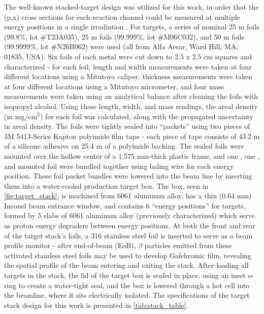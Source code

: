 \documentclass[3p]{elsarticle}
\begin{document}
The well-known stacked-target design was utilized for this work, in order that the (p,x) cross sections for each reaction channel could be measured at multiple energy positions in a single irradiation \cite{Graves2016}. 
For targets, a series of nominal 25 \micro m  foils (99.8\%, lot \#T23A035), 25 \micro m  foils (99.999\%, lot \#M06C032), and 50 \micro m  foils (99.9999\%, lot \#N26B062) were used (all from Alfa Aesar, Ward Hill, MA, 01835, USA).
Six foils of each metal were cut down to 2.5 x 2.5 cm squares and characterized - for each foil, length and width measurements were taken at four different locations using a Mitutoyo caliper, thickness measurements were taken at four different locations using a Mitutoyo micrometer, and four mass measurements were taken using an analytical balance after cleaning the foils with isopropyl alcohol.
Using these length, width, and mass readings, the areal density (in mg/cm$^2$) for each foil was calculated, along with the propagated uncertainty in areal density.
The foils were tightly sealed into \enquote{packets} using two pieces of  3M 5413-Series Kapton polyimide film tape - each piece of tape consists of 43.2 \micro m of a silicone adhesive on 25.4 \micro m of a polyimide backing.
The sealed foils were mounted over the hollow center of a 1.575 mm-thick plastic frame, and one , one , and  mounted foil were bundled together using baling wire for each energy position.
These foil packet bundles were lowered into the beam line by inserting them into a  water-cooled production target box.
The box, seen in \autoref{fig:target_stack}, is machined from 6061 aluminum alloy, has a thin (0.64 mm) Inconel beam entrance window, and  contains 6 \enquote{energy positions} for targets, formed by  5 slabs of 6061 aluminum alloy (previously characterized) which serve as proton energy degraders  between energy positions.
At both the front and rear of the target stack's foils, a 316 stainless steel foil is inserted to serve as a beam profile monitor - after end-of-beam (EoB), $\beta$ particles emitted from these activated stainless steel foils may be used to develop Gafchromic film, revealing the spatial profile of the beam entering and exiting the stack.
After loading all targets in the stack, the lid of the target box is sealed in place, using an inset o-ring to create a water-tight seal, and the box is lowered through a hot cell into the beamline, where it sits electrically isolated.
The specifications of the target stack design for this work is presented in \autoref{tab:stack_table}.
\end{document}
